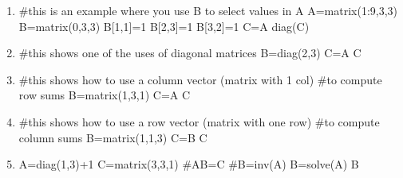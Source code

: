 \begin{enumerate}
\item
\begin{Schunk}
\begin{Sinput}
 #this is an example where you use B to select values in A
 A=matrix(1:9,3,3)
 B=matrix(0,3,3)
 B[1,1]=1
 B[2,3]=1
 B[3,2]=1
 C=A%*%B
 diag(C)
\end{Sinput}
\end{Schunk}

\item
\begin{Schunk}
\begin{Sinput}
 #this shows one of the uses of diagonal matrices
 B=diag(2,3)
 C=A%*%B
 C
\end{Sinput}
\end{Schunk}

\item
\begin{Schunk}
\begin{Sinput}
 #this shows how to use a column vector (matrix with 1 col) 
 #to compute row sums
 B=matrix(1,3,1)
 C=A%*%B
 C
\end{Sinput}
\end{Schunk}

\item
\begin{Schunk}
\begin{Sinput}
 #this shows how to use a row vector (matrix with one row) 
 #to compute column sums
 B=matrix(1,1,3)
 C=B%*%A
 C
\end{Sinput}
\end{Schunk}
 
\item
\begin{Schunk}
\begin{Sinput}
 A=diag(1,3)+1
 C=matrix(3,3,1)
 #AB=C
 #B=inv(A)%*%C
 B=solve(A)%*%C
 B
\end{Sinput}
\end{Schunk}

\end{enumerate}


